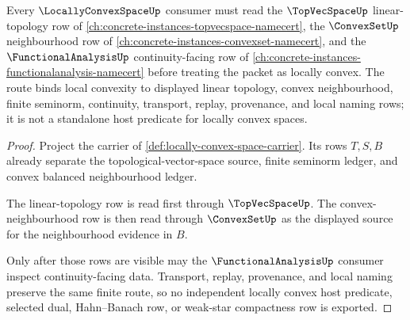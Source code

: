 \begin{theorem}
\label{thm:locally-convex-space-topological-vector-space-route}
Every $\LocallyConvexSpaceUp$ consumer must read the $\TopVecSpaceUp$ linear-topology row of \autoref{ch:concrete-instances-topvecspace-namecert}, the $\ConvexSetUp$ neighbourhood row of \autoref{ch:concrete-instances-convexset-namecert}, and the $\FunctionalAnalysisUp$ continuity-facing row of \autoref{ch:concrete-instances-functionalanalysis-namecert} before treating the packet as locally convex. The route binds local convexity to displayed linear topology, convex neighbourhood, finite seminorm, continuity, transport, replay, provenance, and local naming rows; it is not a standalone host predicate for locally convex spaces.
\end{theorem}
\begin{proof}
Project the carrier of \autoref{def:locally-convex-space-carrier}. Its rows $T,S,B$ already separate the topological-vector-space source, finite seminorm ledger, and convex balanced neighbourhood ledger.

The linear-topology row is read first through $\TopVecSpaceUp$. The convex-neighbourhood row is then read through $\ConvexSetUp$ as the displayed source for the neighbourhood evidence in $B$.

Only after those rows are visible may the $\FunctionalAnalysisUp$ consumer inspect continuity-facing data. Transport, replay, provenance, and local naming preserve the same finite route, so no independent locally convex host predicate, selected dual, Hahn--Banach row, or weak-star compactness row is exported.
\end{proof}
